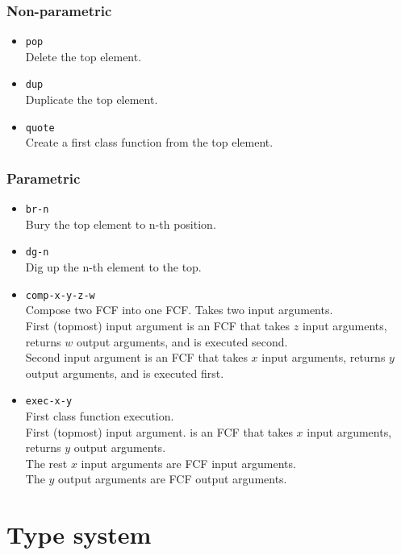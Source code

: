\documentclass{article}
\begin{document}
\subsubsection*{Non-parametric}
\begin{itemize}
\item \texttt{pop} \\
  Delete the top element.
\item \texttt{dup} \\
  Duplicate the top element.
\item \texttt{quote} \\
  Create a first class function from the top element.
\end{itemize}

\subsubsection*{Parametric}
\begin{itemize}
\item \texttt{br-n} \\
  Bury the top element to n-th position.
\item \texttt{dg-n} \\
  Dig up the n-th element to the top.
\item \texttt{comp-x-y-z-w} \\
  Compose two FCF into one FCF. Takes two input arguments. \\
  First (topmost) input argument is an FCF that takes $z$ input arguments,
  returns $w$ output arguments, and is executed second. \\
  Second input argument is an FCF that takes $x$ input arguments, returns $y$
  output arguments, and is executed first. \\
\item \texttt{exec-x-y} \\
  First class function execution. \\
  First (topmost) input argument. is an FCF that takes $x$ input arguments,
  returns $y$ output arguments. \\
  The rest $x$ input arguments are FCF input arguments. \\
  The $y$ output arguments are FCF output arguments. \\
\end{itemize}

\section*{Type system}
\end{document}
